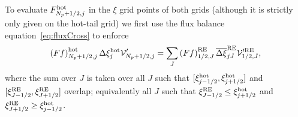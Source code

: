 \documentclass{notes}
\newcommand{\Vp}{\mathcal{V}'}
\begin{document}
    To evaluate $F^{\rm hot}_{N_p+1/2,j}$ in the $\xi$ grid points of both grids
    (although it is strictly only given on the hot-tail grid) we first use the
    flux balance equation~\eqref{eq:fluxCross} to enforce
    \begin{equation}\label{eq:fluxBalance2}
        \left( F f \right)^{\rm hot}_{N_p+1/2,j} \Delta\xi^{\rm hot}_j\Vp_{N_p+1/2,j} =
        \sum_J \left( F f \right)^{\rm RE}_{1/2,J} \overline{\Delta\xi}^{\rm RE}_{jJ} \Vp^{\rm RE}_{1/2,J},
    \end{equation}
    where the sum over $J$ is taken over all $J$ such that
    $[\xi_{j-1/2}^{\rm hot}, \xi_{j+1/2}^{\rm hot}]$ and $[\xi_{J-1/2}^{\rm RE},\xi_{J+1/2}^{\rm RE}]$
    overlap; equivalently all $J$ such that $\xi^{\rm RE}_{J-1/2}\leq\xi^{\rm hot}_{j+1/2}$
    and $\xi^{\rm RE}_{J+1/2}\geq\xi^{\rm hot}_{j-1/2}$.
\end{document}
